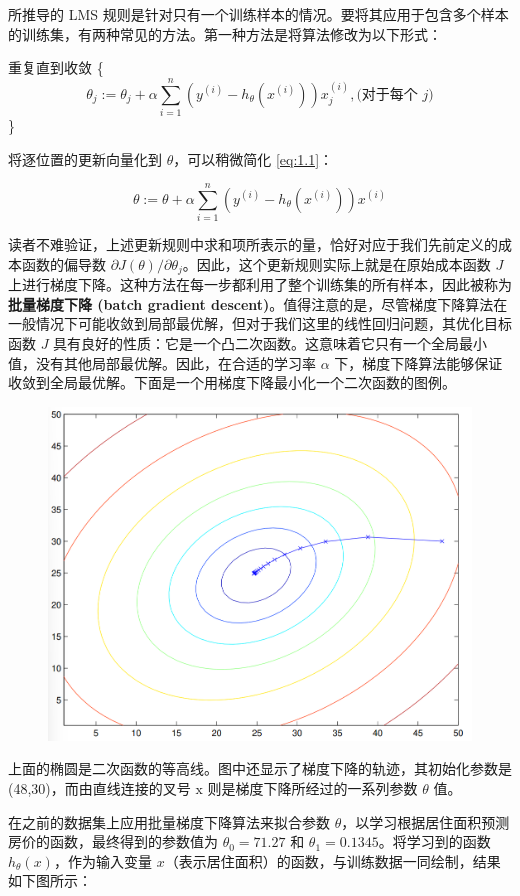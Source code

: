 所推导的 LMS 规则是针对只有一个训练样本的情况。要将其应用于包含多个样本的训练集，有两种常见的方法。第一种方法是将算法修改为以下形式：

\vspace{0.5em}
重复直到收敛 \{
\begin{equation}
    \theta_j := \theta_j + \alpha \sum_{i=1}^n (y^{(i)} - h_\theta(x^{(i)})) x_j^{(i)}, \text{(对于每个 } j) \label{eq:1.1}
\end{equation}
\indent\}
\vspace{0.5em}

将逐位置的更新向量化到 $\theta$，可以稍微简化 \eqref{eq:1.1}：

\[
    \theta := \theta + \alpha \sum_{i=1}^n (y^{(i)} - h_\theta(x^{(i)})) x^{(i)}
\]

读者不难验证，上述更新规则中求和项所表示的量，恰好对应于我们先前定义的成本函数的偏导数 $\partial J(\theta) / \partial \theta_j$。因此，这个更新规则实际上就是在原始成本函数 $J$ 上进行梯度下降。这种方法在每一步都利用了整个训练集的所有样本，因此被称为\textbf{批量梯度下降 (batch gradient descent)}。值得注意的是，尽管梯度下降算法在一般情况下可能收敛到局部最优解，但对于我们这里的线性回归问题，其优化目标函数 $J$ 具有良好的性质：它是一个凸二次函数。这意味着它只有一个全局最小值，没有其他局部最优解。因此，在合适的学习率 $\alpha$ 下，梯度下降算法能够保证收敛到全局最优解。下面是一个用梯度下降最小化一个二次函数的图例。

\begin{figure}[H]
    \centering
    \includegraphics[width=0.5\linewidth]{figs/gradient_descent_trajectory.png}
    \label{fig:gradient_descent_trajectory}
\end{figure}
上面的椭圆是二次函数的等高线。图中还显示了梯度下降的轨迹，其初始化参数是 (48,30)，而由直线连接的叉号 $\text{x}$ 则是梯度下降所经过的一系列参数 $\theta$ 值。

在之前的数据集上应用批量梯度下降算法来拟合参数 $\theta$，以学习根据居住面积预测房价的函数，最终得到的参数值为 $\theta_0 = 71.27$ 和 $\theta_1 = 0.1345$。将学习到的函数 $h_\theta(x)$，作为输入变量 $x$（表示居住面积）的函数，与训练数据一同绘制，结果如下图所示：

